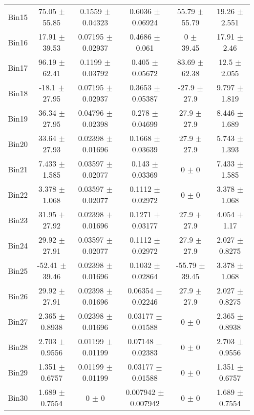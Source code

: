 \begin{tabular}{@{\extracolsep{4pt}}lccccc@{}}
     Bin15 & 75.05 $\pm$ 55.85 & 0.1559 $\pm$ 0.04323 & 0.6036 $\pm$ 0.06924 & 55.79 $\pm$ 55.79 & 19.26 $\pm$ 2.551 \\ 
     Bin16 & 17.91 $\pm$ 39.53 & 0.07195 $\pm$ 0.02937 & 0.4686 $\pm$ 0.061 & 0 $\pm$ 39.45 & 17.91 $\pm$ 2.46 \\ 
     Bin17 & 96.19 $\pm$ 62.41 & 0.1199 $\pm$ 0.03792 & 0.405 $\pm$ 0.05672 & 83.69 $\pm$ 62.38 & 12.5 $\pm$ 2.055 \\ 
     Bin18 & -18.1 $\pm$ 27.95 & 0.07195 $\pm$ 0.02937 & 0.3653 $\pm$ 0.05387 & -27.9 $\pm$ 27.9 & 9.797 $\pm$ 1.819 \\ 
     Bin19 & 36.34 $\pm$ 27.95 & 0.04796 $\pm$ 0.02398 & 0.278 $\pm$ 0.04699 & 27.9 $\pm$ 27.9 & 8.446 $\pm$ 1.689 \\ 
     Bin20 & 33.64 $\pm$ 27.93 & 0.02398 $\pm$ 0.01696 & 0.1668 $\pm$ 0.03639 & 27.9 $\pm$ 27.9 & 5.743 $\pm$ 1.393 \\ 
     Bin21 & 7.433 $\pm$ 1.585 & 0.03597 $\pm$ 0.02077 & 0.143 $\pm$ 0.03369 & 0 $\pm$ 0 & 7.433 $\pm$ 1.585 \\ 
     Bin22 & 3.378 $\pm$ 1.068 & 0.03597 $\pm$ 0.02077 & 0.1112 $\pm$ 0.02972 & 0 $\pm$ 0 & 3.378 $\pm$ 1.068 \\ 
     Bin23 & 31.95 $\pm$ 27.92 & 0.02398 $\pm$ 0.01696 & 0.1271 $\pm$ 0.03177 & 27.9 $\pm$ 27.9 & 4.054 $\pm$ 1.17 \\ 
     Bin24 & 29.92 $\pm$ 27.91 & 0.03597 $\pm$ 0.02077 & 0.1112 $\pm$ 0.02972 & 27.9 $\pm$ 27.9 & 2.027 $\pm$ 0.8275 \\ 
     Bin25 & -52.41 $\pm$ 39.46 & 0.02398 $\pm$ 0.01696 & 0.1032 $\pm$ 0.02864 & -55.79 $\pm$ 39.45 & 3.378 $\pm$ 1.068 \\ 
     Bin26 & 29.92 $\pm$ 27.91 & 0.02398 $\pm$ 0.01696 & 0.06354 $\pm$ 0.02246 & 27.9 $\pm$ 27.9 & 2.027 $\pm$ 0.8275 \\ 
     Bin27 & 2.365 $\pm$ 0.8938 & 0.02398 $\pm$ 0.01696 & 0.03177 $\pm$ 0.01588 & 0 $\pm$ 0 & 2.365 $\pm$ 0.8938 \\ 
     Bin28 & 2.703 $\pm$ 0.9556 & 0.01199 $\pm$ 0.01199 & 0.07148 $\pm$ 0.02383 & 0 $\pm$ 0 & 2.703 $\pm$ 0.9556 \\ 
     Bin29 & 1.351 $\pm$ 0.6757 & 0.01199 $\pm$ 0.01199 & 0.03177 $\pm$ 0.01588 & 0 $\pm$ 0 & 1.351 $\pm$ 0.6757 \\ 
     Bin30 & 1.689 $\pm$ 0.7554 & 0 $\pm$ 0 & 0.007942 $\pm$ 0.007942 & 0 $\pm$ 0 & 1.689 $\pm$ 0.7554 \\ 
\hline\hline
  \end{tabular}
